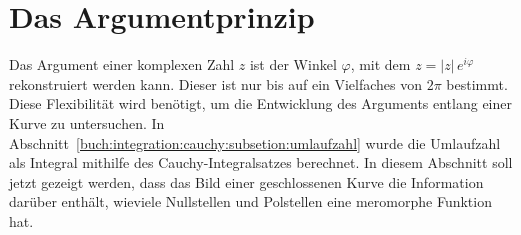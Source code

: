 %
%
%
\section{Das Argumentprinzip
\label{buch:integration:section:argumentprinzip}}
%
Das Argument einer komplexen Zahl $z$ ist der Winkel $\varphi$,
mit dem $z=|z|\,e^{i\varphi}$ rekonstruiert werden kann.
Dieser ist nur bis auf ein Vielfaches von $2\pi$ bestimmt.
Diese Flexibilität wird benötigt, um die Entwicklung des
Arguments entlang einer Kurve zu untersuchen.
In Abschnitt~\ref{buch:integration:cauchy:subsetion:umlaufzahl}
wurde die Umlaufzahl als Integral mithilfe des Cauchy-Integralsatzes
berechnet.
In diesem Abschnitt soll jetzt gezeigt werden, dass das Bild
einer geschlossenen Kurve die Information darüber enthält, wieviele
Nullstellen und Polstellen eine meromorphe Funktion hat.





